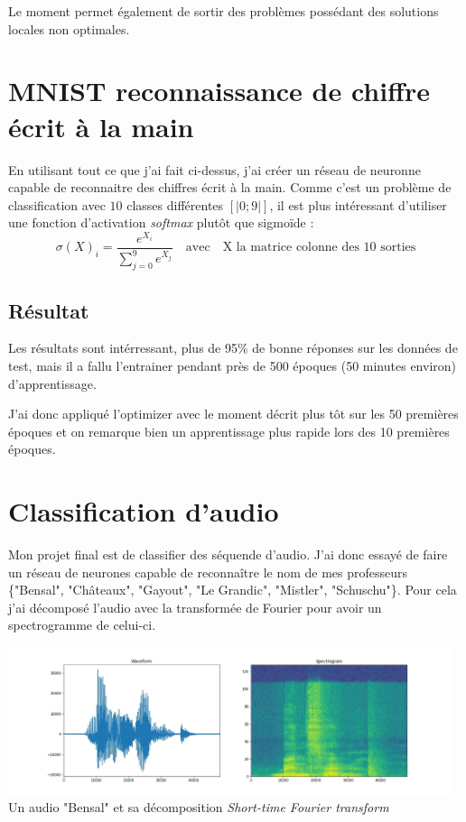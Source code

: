 \documentclass[12pt,a4paper, french]{article}
\begin{document}
Le moment permet également de sortir des problèmes possédant des solutions locales non optimales.


\section{MNIST reconnaissance de chiffre écrit à la main}
En utilisant tout ce que j'ai fait ci-dessus, j'ai créer un réseau de neuronne capable de reconnaitre des chiffres écrit à la main. Comme c'est un problème de classification avec $10$ classes différentes $[|0; 9|]$, il est plus intéressant d'utiliser une fonction d'activation \textit{softmax} plutôt que sigmoïde :  
\begin{equation}
	\sigma(X)_i = \frac{e^{X_i}}{\sum_{j=0}^{9}{e^{X_j}}} 
	\quad \textrm{avec} \quad
	\textrm{X la matrice colonne des 10 sorties}
\end{equation}

\subsection{Résultat}
Les résultats sont intérressant, plus de 95\% de bonne réponses sur les données de test, mais il a fallu l'entrainer pendant près de 500 époques (50 minutes environ) d'apprentissage.

J'ai donc appliqué l'optimizer avec le moment décrit plus tôt sur les 50 premières époques et on remarque bien un apprentissage plus rapide lors des 10 premières époques.


\section{Classification d'audio }
Mon projet final est de classifier des séquende d'audio. J'ai donc essayé de faire un réseau de neurones capable de reconnaître le nom de mes professeurs \{"Bensal", "Châteaux", "Gayout", "Le Grandic", "Mistler", "Schuschu"\}. Pour cela j'ai décomposé l'audio avec la transformée de Fourier pour avoir un spectrogramme de celui-ci.

\begin{center}
    \includegraphics[width=13cm]{4-Audio Bensaal.jpg} \\
    Un audio "Bensal" et sa décomposition \textit{Short-time Fourier transform}
\end{center}
\end{document}

